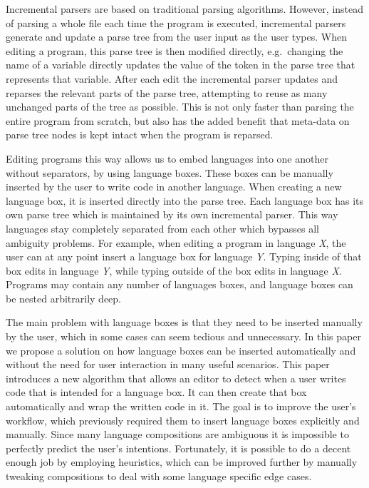 \documentclass[sigplan,screen]{acmart}\settopmatter{printfolios=true,printccs=false,printacmref=false}
\begin{document}
Incremental parsers are based on traditional parsing algorithms. However,
instead of parsing a whole file each time the program is executed, incremental
parsers generate and update a parse tree from the user input as the user types.
When editing a program, this parse tree is then modified directly,
e.g.~changing the name of a variable directly updates the value of the token in
the parse tree that represents that variable. After each edit the incremental
parser updates and reparses the relevant parts of the parse tree, attempting to
reuse as many unchanged parts of the tree as possible. This is not only faster
than parsing the entire program from scratch, but also has the added benefit
that meta-data on parse tree nodes is kept intact when the program is reparsed.

Editing programs this way allows us to embed languages into one another without
separators, by using language boxes. These boxes can be manually inserted by
the user to write code in another language. When creating a new language box,
it is inserted directly into the parse tree. Each language box has its own
parse tree which is maintained by its own incremental parser. This way
languages stay completely separated from each other which bypasses all
ambiguity problems. For example, when editing a program in language \emph{X},
the user can at any point insert a language box for language \emph{Y}. Typing
inside of that box edits in language \emph{Y}, while typing outside of the box
edits in language \emph{X}. Programs may contain any number of languages
boxes, and language boxes can be nested arbitrarily deep.

The main problem with language boxes is that they need to be inserted manually
by the user, which in some cases can seem tedious and unnecessary. In this
paper we propose a solution on how language boxes can be inserted
automatically and without the need for user interaction in many useful
scenarios. This paper introduces a new algorithm that allows an editor to
detect when a user writes code that is intended for a language box. It can then
create that box automatically and wrap the written code in it. The goal is to
improve the user's workflow, which previously required them to insert language
boxes explicitly and manually.  Since many language compositions are ambiguous
it is impossible to perfectly predict the user's intentions. Fortunately, it is
possible to do a decent enough job by employing heuristics, which can be
improved further by manually tweaking compositions to deal with some language
specific edge cases.
\end{document}
